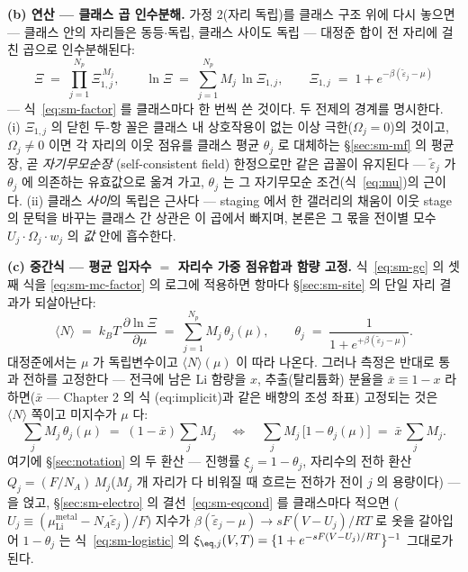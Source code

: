 \textbf{(b) 연산 --- 클래스 곱 인수분해.} 가정 2(자리 독립)를 클래스 구조 위에 다시 놓으면 --- 클래스 안의
자리들은 동등$\cdot$독립, 클래스 사이도 독립 --- 대정준 합이 전 자리에 걸친 곱으로 인수분해된다:
\begin{equation}
\Xi\;=\;\prod_{j=1}^{N_p}\Xi_{1,j}^{\,M_j},\qquad
\ln\Xi\;=\;\sum_{j=1}^{N_p}M_j\,\ln\Xi_{1,j},\qquad
\Xi_{1,j}\;=\;1+e^{-\beta(\tilde\varepsilon_j-\mu)}
\label{eq:sm-mc-factor}
\end{equation}
--- 식~\eqref{eq:sm-factor} 를 클래스마다 한 번씩 쓴 것이다. 두 전제의 경계를 명시한다. (i) $\Xi_{1,j}$ 의
닫힌 두-항 꼴은 클래스 내 상호작용이 없는 이상 극한($\Omega_j=0$)의 것이고, $\Omega_j\ne0$ 이면 각 자리의
이웃 점유를 클래스 평균 $\theta_j$ 로 대체하는 \S\ref{sec:sm-mf} 의 평균장, 곧 \emph{자기무모순장}
(self-consistent field) 한정으로만 같은 곱꼴이 유지된다 --- $\tilde\varepsilon_j$ 가 $\theta_j$ 에 의존하는
유효값으로 옮겨 가고, $\theta_j$ 는 그 자기무모순 조건(식~\eqref{eq:mu})의 근이다. (ii) 클래스 \emph{사이}의
독립은 근사다 --- staging 에서 한 갤러리의 채움이 이웃 stage 의 문턱을 바꾸는 클래스 간 상관은 이 곱에서
빠지며, 본론은 그 몫을 전이별 모수 $U_j\cdot\Omega_j\cdot w_j$ 의 \emph{값} 안에 흡수한다.

\textbf{(c) 중간식 --- 평균 입자수 $=$ 자리수 가중 점유합과 함량 고정.} 식~\eqref{eq:sm-gc} 의 셋째 식을
\eqref{eq:sm-mc-factor} 의 로그에 적용하면 항마다 \S\ref{sec:sm-site} 의 단일 자리 결과가 되살아난다:
\begin{equation}
\langle N\rangle\;=\;k_BT\,\frac{\partial\ln\Xi}{\partial\mu}
\;=\;\sum_{j=1}^{N_p}M_j\,\theta_j(\mu),\qquad
\theta_j\;=\;\frac{1}{1+e^{+\beta(\tilde\varepsilon_j-\mu)}}.
\label{eq:sm-mc-N}
\end{equation}
대정준에서는 $\mu$ 가 독립변수이고 $\langle N\rangle(\mu)$ 이 따라 나온다. 그러나 측정은 반대로 통과 전하를
고정한다 --- 전극에 남은 Li 함량을 $x$, 추출(탈리튬화) 분율을 $\bar x\equiv1-x$ 라 하면($\bar x$ ---
Chapter 2 의 식 (eq:implicit)과 같은 배향의 조성 좌표) 고정되는 것은 $\langle N\rangle$ 쪽이고 미지수가
$\mu$ 다:
\begin{equation}
\sum_jM_j\,\theta_j(\mu)\;=\;(1-\bar x)\sum_jM_j
\quad\Longleftrightarrow\quad
\sum_jM_j\,\big[1-\theta_j(\mu)\big]\;=\;\bar x\,\sum_jM_j.
\label{eq:sm-mc-fix}
\end{equation}
여기에 \S\ref{sec:notation} 의 두 환산 --- 진행률 $\xi_j=1-\theta_j$, 자리수의 전하 환산
$Q_j=(F/N_A)\,M_j$($M_j$ 개 자리가 다 비워질 때 흐르는 전하가 전이 $j$ 의 용량이다) --- 을 얹고,
\S\ref{sec:sm-electro} 의 결선~\eqref{eq:sm-eqcond} 를 클래스마다 적으면
($U_j\equiv(\mu_\mathrm{Li}^\mathrm{metal}-N_A\tilde\varepsilon_j)/F$) 지수가 $\beta(\tilde\varepsilon_j-\mu)
\to sF(V-U_j)/RT$ 로 옷을 갈아입어 $1-\theta_j$ 는 식~\eqref{eq:sm-logistic} 의
$\xi_{\eq,j}(V,T)=\{1+e^{-sF(V-U_j)/RT}\}^{-1}$ 그대로가 된다.

